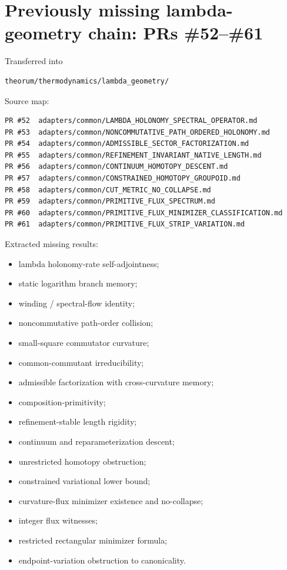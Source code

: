 \hypertarget{previously-missing-lambda-geometry-chain-prs-5261}{%
\section{Previously missing lambda-geometry chain: PRs \#52--\#61}\label{previously-missing-lambda-geometry-chain-prs-5261}}

Transferred into

\begin{verbatim}
theorum/thermodynamics/lambda_geometry/
\end{verbatim}

Source map:

\begin{verbatim}
PR #52  adapters/common/LAMBDA_HOLONOMY_SPECTRAL_OPERATOR.md
PR #53  adapters/common/NONCOMMUTATIVE_PATH_ORDERED_HOLONOMY.md
PR #54  adapters/common/ADMISSIBLE_SECTOR_FACTORIZATION.md
PR #55  adapters/common/REFINEMENT_INVARIANT_NATIVE_LENGTH.md
PR #56  adapters/common/CONTINUUM_HOMOTOPY_DESCENT.md
PR #57  adapters/common/CONSTRAINED_HOMOTOPY_GROUPOID.md
PR #58  adapters/common/CUT_METRIC_NO_COLLAPSE.md
PR #59  adapters/common/PRIMITIVE_FLUX_SPECTRUM.md
PR #60  adapters/common/PRIMITIVE_FLUX_MINIMIZER_CLASSIFICATION.md
PR #61  adapters/common/PRIMITIVE_FLUX_STRIP_VARIATION.md
\end{verbatim}

Extracted missing results:

\begin{itemize}
\tightlist
\item
  lambda holonomy-rate self-adjointness;
\item
  static logarithm branch memory;
\item
  winding / spectral-flow identity;
\item
  noncommutative path-order collision;
\item
  small-square commutator curvature;
\item
  common-commutant irreducibility;
\item
  admissible factorization with cross-curvature memory;
\item
  composition-primitivity;
\item
  refinement-stable length rigidity;
\item
  continuum and reparameterization descent;
\item
  unrestricted homotopy obstruction;
\item
  constrained variational lower bound;
\item
  curvature-flux minimizer existence and no-collapse;
\item
  integer flux witnesses;
\item
  restricted rectangular minimizer formula;
\item
  endpoint-variation obstruction to canonicality.
\end{itemize}

